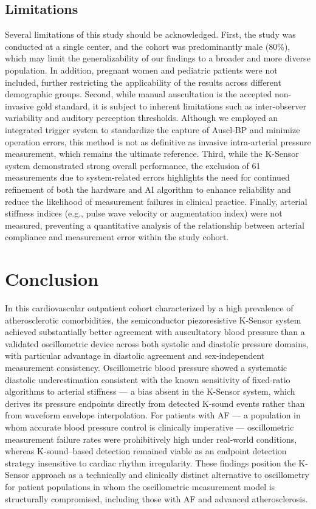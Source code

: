 \documentclass[
  12pt,
  letterpaper,
  openany,
  oneside]{book}
\begin{document}
\section{Limitations}\label{limitations}

Several limitations of this study should be acknowledged. First, the
study was conducted at a single center, and the cohort was predominantly
male (80\%), which may limit the generalizability of our findings to a
broader and more diverse population. In addition, pregnant women and
pediatric patients were not included, further restricting the
applicability of the results across different demographic groups.
Second, while manual auscultation is the accepted non-invasive gold
standard, it is subject to inherent limitations such as inter-observer
variability and auditory perception thresholds. Although we employed an
integrated trigger system to standardize the capture of Auscl-BP and
minimize operation errors, this method is not as definitive as invasive
intra-arterial pressure measurement, which remains the ultimate
reference. Third, while the K-Sensor system demonstrated strong overall
performance, the exclusion of 61 measurements due to system-related
errors highlights the need for continued refinement of both the hardware
and AI algorithm to enhance reliability and reduce the likelihood of
measurement failures in clinical practice. Finally, arterial stiffness
indices (e.g., pulse wave velocity or augmentation index) were not
measured, preventing a quantitative analysis of the relationship between
arterial compliance and measurement error within the study cohort.


\chapter{Conclusion}\label{conclusion}

In this cardiovascular outpatient cohort characterized by a high
prevalence of atherosclerotic comorbidities, the semiconductor
piezoresistive K-Sensor system achieved substantially better agreement
with auscultatory blood pressure than a validated oscillometric device
across both systolic and diastolic pressure domains, with particular
advantage in diastolic agreement and sex-independent measurement
consistency. Oscillometric blood pressure showed a systematic diastolic
underestimation consistent with the known sensitivity of fixed-ratio
algorithms to arterial stiffness --- a bias absent in the K-Sensor
system, which derives its pressure endpoints directly from detected
K-sound events rather than from waveform envelope interpolation. For
patients with AF --- a population in whom accurate blood pressure
control is clinically imperative --- oscillometric measurement failure
rates were prohibitively high under real-world conditions, whereas
K-sound--based detection remained viable as an endpoint detection
strategy insensitive to cardiac rhythm irregularity. These findings
position the K-Sensor approach as a technically and clinically distinct
alternative to oscillometry for patient populations in whom the
oscillometric measurement model is structurally compromised, including
those with AF and advanced atherosclerosis.
\end{document}
